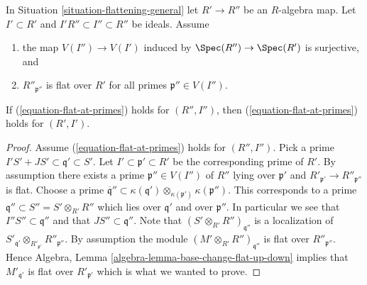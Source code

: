 \begin{lemma}
\label{lemma-flat-descent-flat-at-primes}
In Situation \ref{situation-flattening-general}
let $R' \to R''$ be an $R$-algebra map.
Let $I' \subset R'$ and $I'R'' \subset I'' \subset R''$ be ideals.
Assume
\begin{enumerate}
\item the map $V(I'') \to V(I')$ induced by
$\Spec(R'') \to \Spec(R')$ is surjective, and
\item $R''_{\mathfrak p''}$ is flat over $R'$ for all primes
$\mathfrak p'' \in V(I'')$.
\end{enumerate}
If (\ref{equation-flat-at-primes}) holds for
$(R'', I'')$, then (\ref{equation-flat-at-primes}) holds for $(R', I')$.
\end{lemma}

\begin{proof}
Assume (\ref{equation-flat-at-primes}) holds for $(R'', I'')$. Pick a prime
$I'S' + JS' \subset \mathfrak q' \subset S'$. Let
$I' \subset \mathfrak p' \subset R'$ be the corresponding prime of $R'$.
By assumption there exists a prime $\mathfrak p'' \in V(I'')$ of $R''$
lying over $\mathfrak p'$ and $R'_{\mathfrak p'} \to R''_{\mathfrak p''}$
is flat. Choose a prime
$\overline{\mathfrak q}'' \subset
\kappa(\mathfrak q') \otimes_{\kappa(\mathfrak p')} \kappa(\mathfrak p'')$.
This corresponds to a prime $\mathfrak q'' \subset S'' = S' \otimes_{R'} R''$
which lies over $\mathfrak q'$ and over $\mathfrak p''$. In particular
we see that $I''S'' \subset \mathfrak q''$ and that
$JS'' \subset \mathfrak q''$. Note that
$(S' \otimes_{R'} R'')_{\mathfrak q''}$ is a localization of
$S'_{\mathfrak q'} \otimes_{R'_{\mathfrak p'}} R''_{\mathfrak p''}$.
By assumption the module $(M' \otimes_{R'} R'')_{\mathfrak q''}$ is
flat over $R''_{\mathfrak p''}$. Hence
Algebra, Lemma \ref{algebra-lemma-base-change-flat-up-down}
implies that $M'_{\mathfrak q'}$ is flat over $R'_{\mathfrak p'}$
which is what we wanted to prove.
\end{proof}
